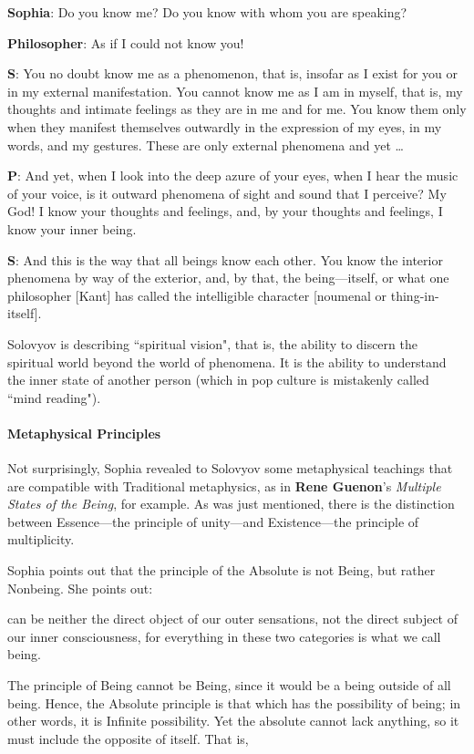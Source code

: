 \textbf{Sophia}: Do you know me? Do you know with whom you are speaking?

\textbf{Philosopher}: As if I could not know you!

\textbf{S}: You no doubt know me as a phenomenon, that is, insofar as I exist for you or in my external manifestation. You cannot know me as I am in myself, that is, my thoughts and intimate feelings as they are in me and for me. You know them only when they manifest themselves outwardly in the expression of my eyes, in my words, and my gestures. These are only external phenomena and yet …

\textbf{P}: And yet, when I look into the deep azure of your eyes, when I hear the music of your voice, is it outward phenomena of sight and sound that I perceive? My God! I know your thoughts and feelings, and, by your thoughts and feelings, I know your inner being.

\textbf{S}: And this is the way that all beings know each other. You know the interior phenomena by way of the exterior, and, by that, the being—itself, or what one philosopher [Kant] has called the intelligible character [noumenal or thing-in-itself].

Solovyov is describing ``spiritual vision", that is, the ability to discern the spiritual world beyond the world of phenomena. It is the ability to understand the inner state of another person (which in pop culture is mistakenly called ``mind reading").

\paragraph{Metaphysical Principles}
Not surprisingly, Sophia revealed to Solovyov some metaphysical teachings that are compatible with Traditional metaphysics, as in \textbf{Rene Guenon}'s \emph{Multiple States of the Being}, for example. As was just mentioned, there is the distinction between Essence—the principle of unity—and Existence—the principle of multiplicity.

Sophia points out that the principle of the Absolute is not Being, but rather Nonbeing. She points out:

\begin{quotex}
 can be neither the direct object of our outer sensations, not the direct subject of our inner consciousness, for everything in these two categories is what we call being. 

\end{quotex}
The principle of Being cannot be Being, since it would be a being outside of all being. Hence, the Absolute principle is that which has the possibility of being; in other words, it is Infinite possibility. Yet the absolute cannot lack anything, so it must include the opposite of itself. That is,

